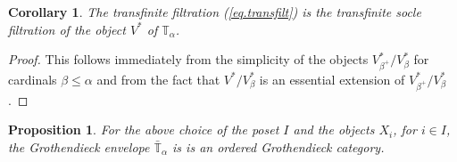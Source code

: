 \documentclass[11pt]{article}
\theoremstyle{plain}
\newtheorem{proposition}[lemma]{Proposition}
\newtheorem{corollary}[lemma]{Corollary}
\theoremstyle{nonumberplain}
\theoremstyle{plain}
\theoremstyle{nonumberplain}
\newtheorem{proof}{Proof}
\newcommand\bT{\mathbb T}
\begin{document}
%

\begin{corollary}
	The transfinite filtration (\ref{eq.transfilt}) is the transfinite socle filtration of the object $V^*$ of $\bT_\alpha$.
\end{corollary}

\begin{proof}
	This follows immediately from the simplicity of the objects $V^*_{\beta^+}/V^*_\beta$ for cardinals $\beta\leq \alpha$ and from the fact that $V^*/V^*_\beta$ is an essential extension of $V^*_{\beta^+}/V^*_\beta$.
\end{proof}

\begin{proposition}\label{pr.isordered} {For the above choice of the
    poset $I$ and the objects $X_i$, for $i\in I$,
    the Grothendieck envelope $\bar{\bT}_\alpha$ is is an ordered
    Grothendieck category.} 
\end{proposition}
\end{document}
